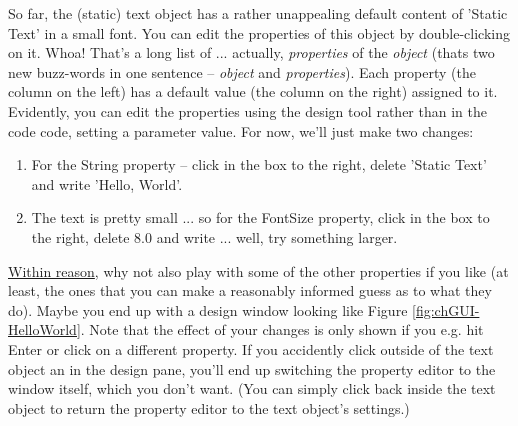 \documentclass{tufte-book} %
\begin{document}
So far, the (static) text object has a rather unappealing default content of '\textsf{Static Text}' in a small font. You can edit the properties of this object by double-clicking on it. Whoa! That's a long list of ... actually, \textit{properties} of the \textit{object} (thats two new buzz-words in one sentence -- \textit{object} and \textit{properties}). Each property (the column on the left) has a default value (the column on the right) assigned to it. Evidently, you can edit the properties using the design tool rather than in the code code, setting a parameter value. For now, we'll just make two changes:
\begin{enumerate}[noitemsep]
\setlength{\itemindent}{.2in}
\item For the \textsf{String} property -- click in the box to the right, delete '\textsf{Static Text}' and write '\textsf{Hello, World}'.
\item The text is pretty small ... so for the \textsf{FontSize} property, click in the box to the right, delete \textsf{8.0} and write ... well, try something larger.
\end{enumerate}

\uline{Within reason}, why not also play with some of the other properties if you like (at least, the ones that you can make a reasonably informed guess as to what they do). Maybe you end up with a design window looking like Figure \ref{fig:chGUI-HelloWorld}. Note that the effect of your changes is only shown if you e.g. hit \textsf{Enter} or click on a different property. If you accidently click outside of the text object an in the design pane, you'll end up switching the property editor to the window itself, which you don't want. (You can simply click back inside the text object to return the property editor to the text object's settings.)
\end{document}
